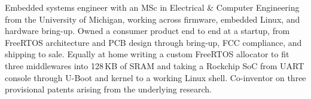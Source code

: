 \documentclass[11pt,a4paper,sans]{moderncv}
\begin{document}
\makecvtitle


\vspace{6pt}
\small{Embedded systems engineer with an MSc in Electrical \& Computer Engineering from the University of Michigan, working across firmware, embedded Linux, and hardware bring-up. Owned a consumer product end to end at a startup, from FreeRTOS architecture and PCB design through bring-up, FCC compliance, and shipping to sale. Equally at home writing a custom FreeRTOS allocator to fit three middlewares into 128\,KB of SRAM and taking a Rockchip SoC from UART console through U-Boot and kernel to a working Linux shell. Co-inventor on three provisional patents arising from the underlying research.}

\end{document}
